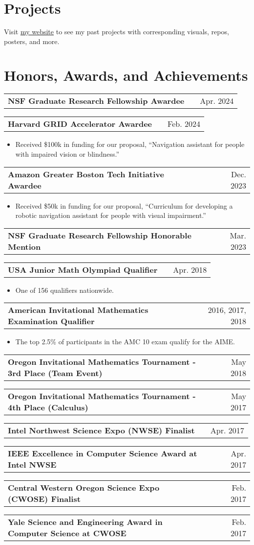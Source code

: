 \documentclass[a4paper,12pt]{article}
\makeatletter
\newenvironment{jobshort}[2]
    {
    \begin{tabularx}{\linewidth}{@{}l X r@{}}
    \textbf{#1} & \hfill &  #2 \\[3.75pt]
    \end{tabularx}
    }
    {
    }
\newenvironment{joblong}[2]
    {
    \begin{tabularx}{\linewidth}{@{}l X r@{}}
    \textbf{#1} & \hfill &  #2 \\[3.75pt]
    \end{tabularx}
    \begin{minipage}[t]{\linewidth}
    \begin{itemize}[nosep,after=\strut, leftmargin=1em, itemsep=3pt,label=--]
    }
    {
    \end{itemize}
    \end{minipage}    
    }
\makeatother
\begin{document}
\section{Projects}
Visit \href{https://rl27.github.io/}{my website} to see my past projects with corresponding visuals, repos, posters, and more.

\section{Honors, Awards, and Achievements}

\begin{jobshort}{NSF Graduate Research Fellowship Awardee}{Apr. 2024}
\end{jobshort}
\begin{joblong}{Harvard GRID Accelerator Awardee}{Feb. 2024}
    \item Received \$100k in funding for our proposal, “Navigation assistant for people with impaired vision or blindness.” 
\end{joblong}
\begin{joblong}{Amazon Greater Boston Tech Initiative Awardee}{Dec. 2023}
    \item Received \$50k in funding for our proposal, “Curriculum for developing a robotic navigation assistant for people with visual impairment.” 
\end{joblong}
\begin{jobshort}{NSF Graduate Research Fellowship Honorable Mention}{Mar. 2023}
\end{jobshort}
\begin{joblong}{USA Junior Math Olympiad Qualifier}{Apr. 2018}
    \item One of 156 qualifiers nationwide.
\end{joblong}
\begin{joblong}{American Invitational Mathematics Examination Qualifier}{2016, 2017, 2018}
    \item The top 2.5\% of participants in the AMC 10 exam qualify for the AIME.
\end{joblong}
\begin{jobshort}{Oregon Invitational Mathematics Tournament - 3rd Place (Team Event)}{May 2018}
\end{jobshort}
\begin{jobshort}{Oregon Invitational Mathematics Tournament - 4th Place (Calculus)}{May 2017}
\end{jobshort}
\begin{jobshort}{Intel Northwest Science Expo (NWSE) Finalist}{Apr. 2017}
\end{jobshort}
\begin{jobshort}{IEEE Excellence in Computer Science Award at Intel NWSE}{Apr. 2017}
\end{jobshort}
\begin{jobshort}{Central Western Oregon Science Expo (CWOSE) Finalist}{Feb. 2017}
\end{jobshort}
\begin{jobshort}{Yale Science and Engineering Award in Computer Science at CWOSE}{Feb. 2017}
\end{jobshort}
\end{document}
